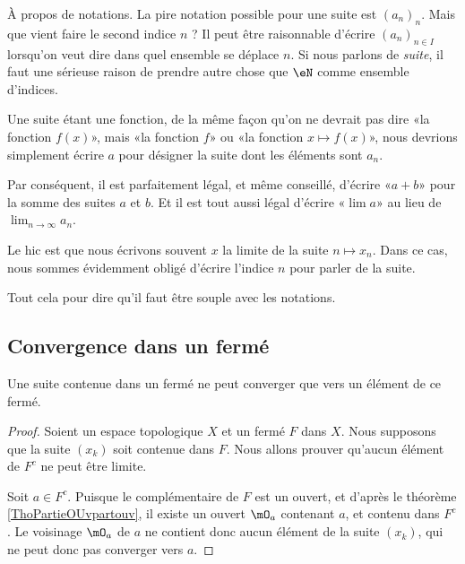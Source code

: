 \begin{normaltext}
	À propos de notations. La pire notation possible pour une suite est \( (a_n)_n\). Mais que vient faire le second indice \( n\) ? Il peut être raisonnable d'écrire \( (a_n)_{n\in I}\) lorsqu'on veut dire dans quel ensemble se déplace \( n\). Si nous parlons de \emph{suite}, il faut une sérieuse raison de prendre autre chose que \( \eN\) comme ensemble d'indices.

	Une suite étant une fonction, de la même façon qu'on ne devrait pas dire «la fonction \( f(x)\)», mais «la fonction \( f\)» ou «la fonction \( x\mapsto f(x)\)», nous devrions simplement écrire \( a\) pour désigner la suite dont les éléments sont \( a_n\).

	Par conséquent, il est parfaitement légal, et même conseillé, d'écrire «\( a+b\)» pour la somme des suites \( a\) et \( b\). Et il est tout aussi légal d'écrire «\( \lim a\)» au lieu de \( \lim_{n\to \infty} a_n\).

	Le hic est que nous écrivons souvent \( x\) la limite de la suite \( n\mapsto x_n\). Dans ce cas, nous sommes évidemment obligé d'écrire l'indice \( n\) pour parler de la suite.

	Tout cela pour dire qu'il faut être souple avec les notations.
\end{normaltext}

\subsection{Convergence dans un fermé}

\begin{proposition}      \label{PROPooBBNSooCjrtRb}
	Une suite contenue dans un fermé ne peut converger que vers un élément de ce fermé.
\end{proposition}

\begin{proof}
	Soient un espace topologique \( X\) et un fermé \( F\) dans \( X\). Nous supposons que la suite \( (x_k)\) soit contenue dans \( F\). Nous allons prouver qu'aucun élément de \( F^c\) ne peut être limite.

	Soit \( a \in F^c\). Puisque le complémentaire de \( F\) est un ouvert, et d'après le théorème \ref{ThoPartieOUvpartouv}, il existe un ouvert \( \mO_a\) contenant \( a\), et contenu dans \( F^c\). Le voisinage \( \mO_a\) de \( a\) ne contient donc aucun élément de la suite \( (x_k)\), qui ne peut donc pas converger vers \( a\).
\end{proof}

